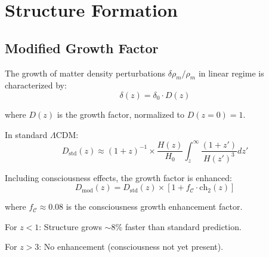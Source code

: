 \section{Structure Formation}

\subsection{Modified Growth Factor}

\begin{defn}\label{def:growth-factor}
The growth of matter density perturbations $\delta \rho_m / \rho_m$ in linear regime is characterized by:
\begin{equation}
\delta(z) = \delta_0 \cdot D(z)
\end{equation}

where $D(z)$ is the growth factor, normalized to $D(z=0) = 1$.

In standard $\Lambda$CDM:
\begin{equation}
D_{\text{std}}(z) \approx (1+z)^{-1} \times \frac{H(z)}{H_0} \int_z^\infty \frac{(1+z')}{H(z')^3} dz'
\end{equation}
\end{defn}

\begin{theorem}\label{thm:growth-modified}
Including consciousness effects, the growth factor is enhanced:
\begin{equation}
\boxed{D_{\text{mod}}(z) = D_{\text{std}}(z) \times \left[ 1 + f_{\mathcal{C}} \cdot \text{ch}_2(z) \right]}
\end{equation}

where $f_{\mathcal{C}} \approx 0.08$ is the consciousness growth enhancement factor.

For $z < 1$: Structure grows $\sim 8\%$ faster than standard prediction.

For $z > 3$: No enhancement (consciousness not yet present).
\end{theorem}

